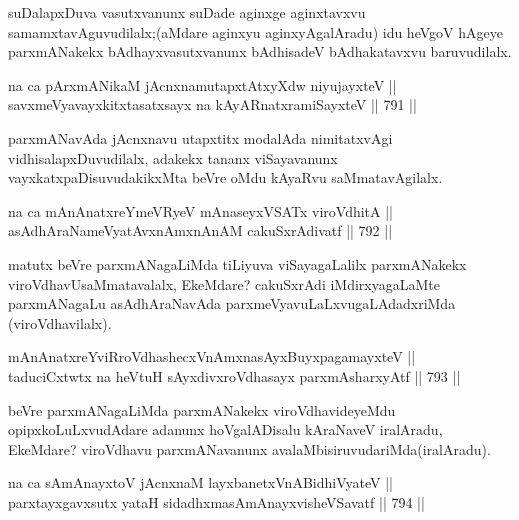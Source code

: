 \begin{artha}
suDalapxDuva vasutxvanunx suDade aginxge aginxtavxvu samamxtavAguvudilalx;(aMdare aginxyu aginxyAgalAradu) idu heVgoV hAgeye parxmANakekx bAdhayxvasutxvanunx bAdhisadeV bAdhakatavxvu baruvudilalx.
\end{artha}


\begin{shl}
na ca pArxmANikaM jAcnxnamutapxtAtxyXdw niyujayxteV || \\
savxmeVyavayxkitxtasatxsayx na kAyARnatxramiSayxteV \hfill || 791 ||  
\end{shl}

\begin{artha}
parxmANavAda jAcnxnavu utapxtitx modalAda nimitatxvAgi vidhisalapxDuvudilalx, adakekx tananx viSayavanunx vayxkatxpaDisuvudakikxMta beVre oMdu kAyaRvu saMmatavAgilalx.
\end{artha}

\begin{shl}
na ca mAnAnatxreYmeVRyeV mAnaseyxVSATx viroVdhitA || \\
asAdhAraNameVyatAvxnAmxnAnAM cakuSxrAdivatf \hfill || 792 ||  
\end{shl}

\begin{artha}
matutx beVre parxmANagaLiMda tiLiyuva viSayagaLalilx parxmANakekx viroVdhavUsaMmatavalalx, EkeMdare? cakuSxrAdi iMdirxyagaLaMte parxmANagaLu asAdhAraNavAda parxmeVyavuLaLxvugaLAdadxriMda (viroVdhavilalx).
\end{artha}

\begin{shl}
mAnAnatxreYviRroVdhashecxVnAmxnasAyxBuyxpagamayxteV || \\
taduciCxtwtx na heVtuH sAyxdivxroVdhasayx parxmAsharxyAtf \hfill || 793 ||  
\end{shl}

\begin{artha}
beVre parxmANagaLiMda parxmANakekx viroVdhavideyeMdu opipxkoLuLxvudAdare adanunx hoVgalADisalu kAraNaveV iralAradu, EkeMdare? viroVdhavu parxmANavanunx avalaMbisiruvudariMda(iralAradu).
\end{artha}


\begin{shl}
na ca sAmAnayxtoV jAcnxnaM layxbanetxVnABidhiVyateV || \\
parxtayxgavxsutx yataH sidadhxmasAmAnayxvisheVSavatf \hfill || 794 ||  
\end{shl}

